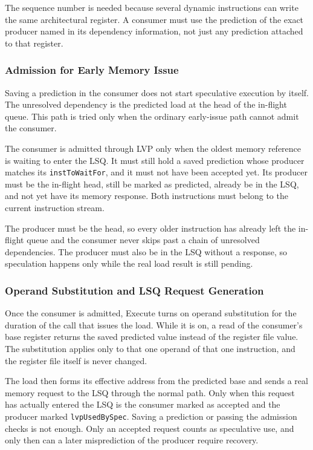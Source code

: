 The sequence number is needed because several dynamic instructions
can write the same architectural register. A consumer must use the
prediction of the exact producer named in its dependency information,
not just any prediction attached to that register.

\subsubsection{Admission for Early Memory Issue}

Saving a prediction in the consumer does not start speculative
execution by itself. The unresolved dependency is the
predicted load at the head of the in-flight queue. This path is tried
only when the ordinary early-issue path cannot admit the consumer.

The consumer is admitted through LVP only when the oldest memory reference is waiting to enter the LSQ. It
must still hold a saved prediction whose producer matches its
\texttt{instToWaitFor}, and it must not have been accepted yet. Its
producer must be the in-flight head, still be marked as predicted,
already be in the LSQ, and not yet have its memory response. Both
instructions must belong to the current instruction stream.

The producer must be the head, so every older instruction has already
left the in-flight queue and the consumer never skips past a chain of
unresolved dependencies. The producer must also be in the LSQ without
a response, so speculation happens only while the real load result is
still pending.

\subsubsection{Operand Substitution and LSQ Request Generation}

Once the consumer is admitted, Execute turns on operand substitution
for the duration of the call that issues the load. While it is on, a
read of the consumer's base register returns the saved predicted value
instead of the register file value. The substitution applies only to
that one operand of that one instruction, and the register file
itself is never changed.

The load then forms its effective address from the predicted base and
sends a real memory request to the LSQ through the normal path. Only
when this request has actually entered the LSQ is the consumer marked
as accepted and the producer marked \texttt{lvpUsedBySpec}. Saving a
prediction or passing the admission checks is not enough. Only an
accepted request counts as speculative use, and only then can a later
misprediction of the producer require recovery.

